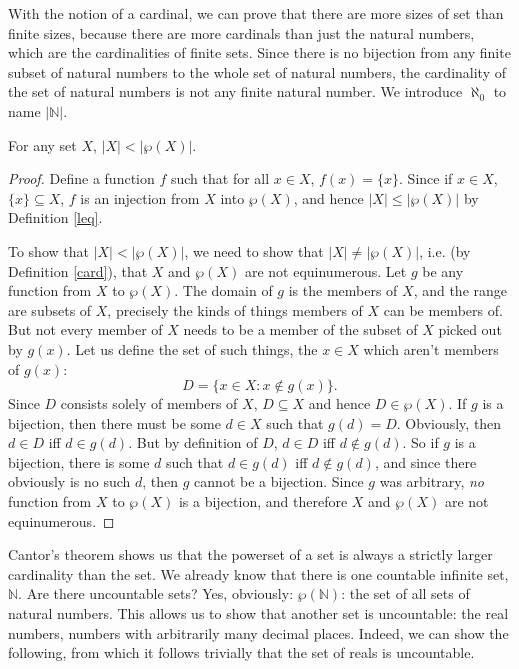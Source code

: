With the notion of a cardinal, we can prove that there are more sizes of set than finite sizes, because there are more cardinals than just the natural numbers, which are the cardinalities of finite sets. Since there is no bijection from any finite subset of natural numbers to the whole set of natural numbers, the cardinality of the set of natural numbers is not any finite natural number. We introduce $\aleph_{0}$ to name $|\mathbb{N}|$. 
\begin{theorem}[Cantor]\label{cantor}
For any set $X$, $|X| < |\wp(X)|$.
\begin{proof}
	Define a function $f$ such that for all $x \in X$, $f(x) = \{x\}$. Since if $x \in X$, $\{x\} \subseteq X$, $f$ is an injection from $X$ into $\wp(X)$, and hence $|X|\leq|\wp(X)|$ by Definition \ref{leq}.
	
	To show that $|X| < |\wp(X)|$, we need to show that $|X| \neq |\wp(X)|$, i.e. (by Definition \ref{card}), that $X$ and $\wp({X})$ are not equinumerous. Let $g$ be any function from $X$ to $\wp(X)$. The domain of $g$ is the members of $X$, and the range are subsets of $X$, precisely the kinds of things members of $X$ can be members of. But not every member of $X$ needs to be a member of the subset of $X$ picked out by $g(x)$. Let us define the set of such things, the $x\in X$ which aren't members of $g(x)$: $$D = \{x \in X : x \notin g(x)\}.$$
	    Since $D$ consists solely of members of $X$, $D \subseteq X$ and hence $D \in \wp(X)$. If $g$ is a bijection, then there must be some $d \in X$ such that $g(d) = D$. Obviously, then $d \in D$ iff $d \in g(d)$. But by definition of $D$, $d \in D$ iff $d \notin g(d)$. So if $g$ is a bijection, there is some $d$ such that $d \in g(d)$ iff $d \notin g(d)$, and since there obviously is no such $d$, then $g$ cannot be a bijection. Since $g$ was arbitrary, \emph{no} function from $X$ to $\wp(X)$ is a bijection, and therefore $X$ and $\wp(X)$ are not equinumerous.
  \end{proof}
\end{theorem} 
Cantor's theorem shows us that the powerset of a set is always a strictly larger cardinality than the set. We already know that there is one countable infinite set, $\mathbb{N}$. Are there uncountable sets? Yes, obviously: $\wp(\mathbb{N})$: the set of all sets of natural numbers. This allows us to show that another set is uncountable: the real numbers, numbers with arbitrarily many decimal places. Indeed, we can show the following, from which it follows trivially that the set of reals is uncountable. 
